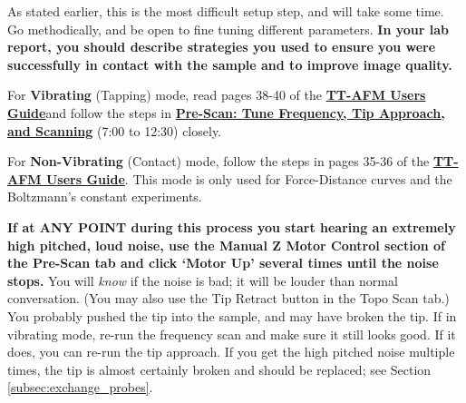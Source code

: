 \documentclass{../lab}
\newcommand{\afmuserguide}{\href{https://berkeley-physics111b.github.io/assets/pdf/oldwebsitestructure/AFMImages/TT_AFM\%20User-Guide-V2.2-600DPI.pdf}{\textbf{TT-AFM Users Guide}}}
\begin{document}
As stated earlier, this is the most difficult setup step, and will take some time. Go methodically, and be open to fine tuning different parameters. \textbf{In your lab report, you should describe strategies you used to ensure you were successfully in contact with the sample and to improve image quality.}

For \textbf{Vibrating} (Tapping) mode, read pages 38-40 of the \afmuserguide and follow the steps in \href{https://berkeley-physics111b.github.io/assets/pdf/oldwebsitestructure/prescan\_final2.mp4}{\textbf{Pre-Scan: Tune Frequency, Tip Approach, and Scanning}} (7:00 to 12:30) closely.

For \textbf{Non-Vibrating} (Contact) mode, follow the steps in pages 35-36 of the \afmuserguide. This mode is only used for Force-Distance curves and the Boltzmann's constant experiments. 

\textbf{If at ANY POINT during this process you start hearing an extremely high pitched, loud noise, use the Manual Z Motor Control section of the Pre-Scan tab and click `Motor Up' several times until the noise stops.} You will \textit{know} if the noise is bad; it will be louder than normal conversation. (You may also use the Tip Retract button in the Topo Scan tab.) You probably pushed the tip into the sample, and may have broken the tip. If in vibrating mode, re-run the frequency scan and make sure it still looks good. If it does, you can re-run the tip approach. If you get the high pitched noise multiple times, the tip is almost certainly broken and should be replaced; see Section \ref{subsec:exchange_probes}.
\end{document}

